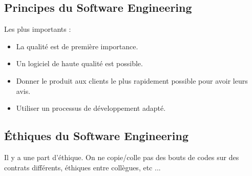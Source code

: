 \subsection{Principes du Software Engineering}
Les plus importants :
\begin{itemize}
   \item La qualité est de première importance.
   \item Un logiciel de haute qualité est possible.
   \item Donner le produit aux clients le plus rapidement possible pour avoir leurs avis.
   \item Utiliser un processus de développement adapté.
\end{itemize}



\subsection{Éthiques du Software Engineering}
Il y a une part d'éthique. On ne copie/colle pas des bouts de codes sur des contrats différents, éthiques entre collègues, etc ...
